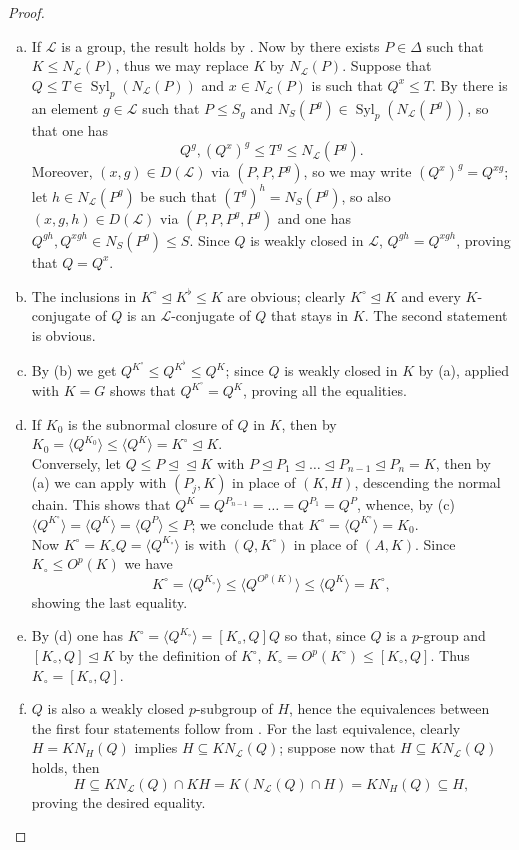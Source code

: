 \documentclass{amsart}
\numberwithin{equation}{section}
\theoremstyle{definition}
\theoremstyle{subresult}
\theoremstyle{caseresult}
\renewcommand{\L}{\mathcal{L}}
\newcommand{\Syl}{\operatorname{Syl}}
\newcommand{\norm}{\trianglelefteq}
\newcommand{\<}{\langle}
\renewcommand{\>}{\rangle}
\begin{document}
\begin{proof}
	\begin{enumerate}[(a)]
		\item If $\L$ is a group, the result holds by \cite[Lemma 1.46(a)]{Meier-Stell-Stroth:2012}. Now by \cite[Lemma 2.10(a)]{Chermak:2022:I} there exists $P \in \Delta$ such that $K \le N_\L(P)$, thus we may replace $K$ by $N_\L(P)$. Suppose that $Q \le T \in \Syl_p(N_\L(P))$ and $x \in N_\L(P)$ is such that $Q^x \le T$. By \cite[Lemma 2.9]{Chermak:2022:I} there is an element $g \in \L$ such that $P \le S_g$ and $N_S(P^g) \in \Syl_p(N_\L(P^g))$, so that one has 
		\[
		Q^g, (Q^x)^g \le T^g \le N_\L(P^g).
		\]
		Moreover, $(x,g) \in D(\L)$ via $(P,P,P^g)$, so we may write $(Q^x)^g=Q^{xg}$; let $h \in N_\L(P^g)$ be such that $(T^g)^h = N_S(P^g)$, so also $(x,g,h) \in D(\L)$ via $(P,P,P^g,P^g)$ and one has $Q^{gh}, Q^{xgh} \in N_S(P^g) \le S$. Since $Q$ is weakly closed in $\L$, $Q^{gh} =Q^{xgh}$, proving that $Q=Q^x$.
		\item The inclusions in $K^\circ \norm K^\flat \le K$ are obvious; clearly $K^\circ \norm K$ and every $K$-conjugate of $Q$ is an $\L$-conjugate of $Q$ that stays in $K$. The second statement is obvious.
		\item By (b) we get $Q^{K^\circ} \le Q^{K^\flat} \le Q^K$; since $Q$ is weakly closed in $K$ by (a), \cite[Lemma 1.46(c)]{Meier-Stell-Stroth:2012} applied with $K=G$ shows that $Q^{K^\circ} = Q^K$, proving all the equalities.
		\item If $K_0$ is the subnormal closure of $Q$ in $K$, then by \cite[Lemma 1.13(a)]{Meier-Stell-Stroth:2012} $K_0 = \< Q^{K_0} \> \le \< Q^{K} \> = K^\circ \norm K$.\\
		Conversely, let $Q \le P \norm \norm K$ with $P \norm P_1 \norm \dots \norm P_{n-1} \norm P_n =K$, then by (a) we can apply \cite[Lemma 1.46(c)]{Meier-Stell-Stroth:2012} with $(P_j,K)$ in place of $(K,H)$, descending the normal chain. This shows that $Q^K = Q^{P_{n-1}} = \dots = Q^{P_1} = Q^P$, whence, by (c) $\< Q^{K^\circ} \> = \< Q^K \> = \< Q^P \> \le P$; we conclude that $K^\circ = \< Q^{K^\circ} \> =K_0$.\\
		Now $K^\circ=K_\circ Q = \< Q^{K_\circ} \>$ is \cite[Lemma 1.13(b)]{Meier-Stell-Stroth:2012} with $(Q,K^\circ)$ in place of $(A,K)$. Since $K_\circ \le O^p(K)$ we have
		\[
		K^\circ = \< Q^{K_\circ} \> \le \< Q^{O^p(K)} \> \le \< Q^K \> = K^\circ,
		\]
		showing the last equality.
		\item By (d) one has $K^\circ = \< Q^{K_\circ} \> = [K_\circ,Q]Q$ so that, since $Q$ is a $p$-group and $[K_\circ,Q] \norm K$ by the definition of $K^\circ$, $K_\circ = O^p(K^\circ) \le [K_\circ,Q]$. Thus $K_\circ = [K_\circ,Q]$.
		\item $Q$ is also a weakly closed $p$-subgroup of $H$, hence the equivalences between the first four statements follow from \cite[Lemma 1.46(f)]{Meier-Stell-Stroth:2012}. For the last equivalence, clearly $H=KN_H(Q)$ implies $H \subseteq KN_\L(Q)$; suppose now that $H \subseteq KN_\L(Q)$ holds, then
		\[
		H \subseteq KN_\L(Q) \cap KH = K(N_\L(Q) \cap H) = KN_H(Q) \subseteq H,
		\]
		proving the desired equality.
	\end{enumerate}
\end{proof}
\end{document}
